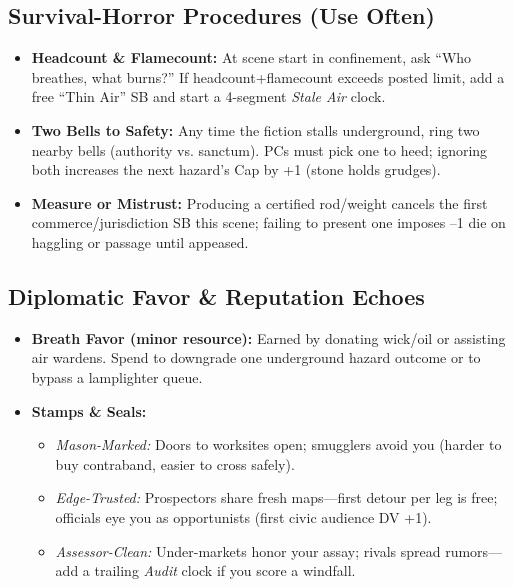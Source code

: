 \subsection*{Survival-Horror Procedures (Use Often)}
\begin{itemize}
  \item \textbf{Headcount \& Flamecount:} At scene start in confinement, ask “Who breathes, what burns?” If headcount+flamecount exceeds posted limit, add a free “Thin Air” SB and start a 4-segment \emph{Stale Air} clock.
  \item \textbf{Two Bells to Safety:} Any time the fiction stalls underground, ring two nearby bells (authority vs. sanctum). PCs must pick one to heed; ignoring both increases the next hazard’s Cap by +1 (stone holds grudges).
  \item \textbf{Measure or Mistrust:} Producing a certified rod/weight cancels the first commerce/jurisdiction SB this scene; failing to present one imposes --1 die on haggling or passage until appeased.
\end{itemize}

\subsection*{Diplomatic Favor \& Reputation Echoes}
\begin{itemize}
  \item \textbf{Breath Favor (minor resource):} Earned by donating wick/oil or assisting air wardens. Spend to downgrade one underground hazard outcome or to bypass a lamplighter queue.
  \item \textbf{Stamps \& Seals:}
    \begin{itemize}
      \item \emph{Mason-Marked:} Doors to worksites open; smugglers avoid you (harder to buy contraband, easier to cross safely).
      \item \emph{Edge-Trusted:} Prospectors share fresh maps—first detour per leg is free; officials eye you as opportunists (first civic audience DV +1).
      \item \emph{Assessor-Clean:} Under-markets honor your assay; rivals spread rumors—add a trailing \emph{Audit} clock if you score a windfall.
    \end{itemize}
\end{itemize}